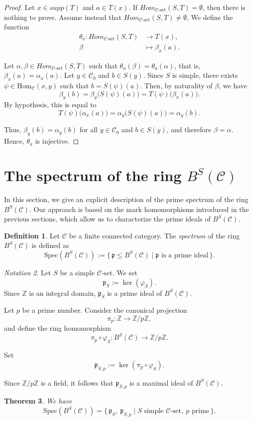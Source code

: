 \documentclass[a4paper]{article}
\newtheorem{thm}{Theorem}[section]
\theoremstyle{definition}
\newtheorem{defi}[thm]{Definition}
\theoremstyle{remark}
\newtheorem{nota}[thm]{Notation}
\newcommand*{\cat}[1]{\mathcal{#1}}
\begin{document}
 \begin{proof}
Let $x \in supp(T)$ and $a \in T(x)$. If $ Hom_{\cat{C}\text{-set}}(S,T)=\emptyset$, then there is nothing to prove. Assume instead that $ Hom_{\cat{C}\text{-set}}(S,T)\neq \emptyset$,  We define the function
\begin{align*}
    \theta_a \colon Hom_{\cat{C}\text{-set}}(S,T) &\longrightarrow T(x),\\
    \beta &\longmapsto \beta_x(a).
\end{align*}

Let $\alpha, \beta \in Hom_{\cat{C}\text{-set}}(S,T)$ such that $\theta_a(\beta) = \theta_a(\alpha)$, that is,
$\beta_x(a) = \alpha_x(a).$ Let $y \in \cat{C}_0$ and $b \in S(y)$. Since $S$ is simple, there exists $\psi \in \mathrm{Hom}_{\cat{C}}(x,y)$ such that $b = S(\psi)(a).$ Then, by naturality of $\beta$, we have
\[
\beta_y(b) = \beta_y\bigl(S(\psi)(a)\bigr) = T(\psi)\bigl(\beta_x(a)\bigr).
\]
By hypothesis, this is equal to
\[
T(\psi)\bigl(\alpha_x(a)\bigr) = \alpha_y\bigl(S(\psi)(a)\bigr) = \alpha_y(b).
\]

Thus, $\beta_y(b) = \alpha_y(b)$ for all $y \in \cat{C}_0$ and $b \in S(y)$, and therefore $\beta = \alpha$. Hence, $\theta_a$ is injective.

\end{proof}


\section{The spectrum of the ring $B^S(\cat{C})$}\label{spec}
In this section, we give an explicit description of the prime spectrum of the ring $B^S(\cat{C})$. Our approach is based on the mark homomorphisms introduced in the previous sections, which allow us to characterize the prime ideals of $B^S(\cat{C})$.


\begin{defi}
Let $\cat{C}$ be a finite connected category. The \emph{spectrum} of the ring $B^S(\cat{C})$ is defined as
\[
\mathrm{Spec}(B^S(\cat{C})) := \{\, \mathfrak{p} \leq B^S(\cat{C}) \mid \mathfrak{p} \text{ is a prime ideal} \,\}.
\]
\end{defi}
\begin{nota}
Let $S$ be a simple $\cat{C}$-set. We set
\[
\mathfrak{p}_S := \ker(\varphi_S).
\]
Since $\mathbb{Z}$ is an integral domain, $\mathfrak{p}_S$ is a prime ideal of $B^S(\cat{C})$.

Let $p$ be a prime number. Consider the canonical projection
\[
\pi_p \colon \mathbb{Z} \longrightarrow \mathbb{Z}/p\mathbb{Z},
\]
and define the ring homomorphism
\[
\pi_p \circ \varphi_S \colon B^S(\cat{C}) \longrightarrow \mathbb{Z}/p\mathbb{Z}.
\]

Set
\[
\mathfrak{p}_{S,p} := \ker(\pi_p \circ \varphi_S).
\]

Since $\mathbb{Z}/p\mathbb{Z}$ is a field, it follows that $\mathfrak{p}_{S,p}$ is a maximal ideal of $B^S(\cat{C})$.
\end{nota}
\begin{thm}
We have
\[
\mathrm{Spec}(B^S(\cat{C})) = \{\, \mathfrak{p}_S,\ \mathfrak{p}_{S,p} \mid S \text{ simple $\cat{C}$-set} ,\ p \text{ prime} \,\}.
\]
\end{thm}
\end{document}
